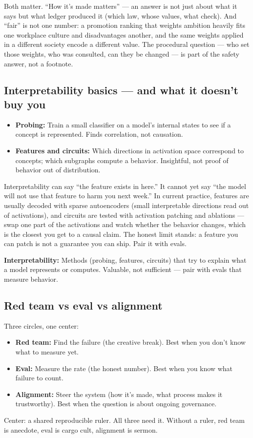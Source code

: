 Both matter. ``How it's made matters'' — an answer is not just about what it says but what ledger produced it (which law, whose values, what check). And ``fair'' is not one number: a promotion ranking that weights ambition heavily fits one workplace culture and disadvantages another, and the same weights applied in a different society encode a different value. The procedural question — who set those weights, who was consulted, can they be changed — is part of the safety answer, not a footnote.

\subsection{Interpretability basics — and what it doesn't buy you}
\begin{itemize}
\item \textbf{Probing:} Train a small classifier on a model's internal states to see if a concept is represented. Finds correlation, not causation.
\item \textbf{Features and circuits:} Which directions in activation space correspond to concepts; which subgraphs compute a behavior. Insightful, not proof of behavior out of distribution.
\end{itemize}
Interpretability can say ``the feature exists in here.'' It cannot yet say ``the model will not use that feature to harm you next week.'' In current practice, features are usually decoded with sparse autoencoders (small interpretable directions read out of activations), and circuits are tested with activation patching and ablations — swap one part of the activations and watch whether the behavior changes, which is the closest you get to a causal claim. The honest limit stands: a feature you can patch is not a guarantee you can ship. Pair it with evals.

\begin{defbox}
\textbf{Interpretability:} Methods (probing, features, circuits) that try to explain what a model represents or computes. Valuable, not sufficient — pair with evals that measure behavior.
\end{defbox}

\subsection{Red team vs eval vs alignment}
Three circles, one center:

\begin{itemize}
\item \textbf{Red team:} Find the failure (the creative break). Best when you don't know what to measure yet.
\item \textbf{Eval:} Measure the rate (the honest number). Best when you know what failure to count.
\item \textbf{Alignment:} Steer the system (how it's made, what process makes it trustworthy). Best when the question is about ongoing governance.
\end{itemize}
Center: a shared reproducible ruler. All three need it. Without a ruler, red team is anecdote, eval is cargo cult, alignment is sermon.

